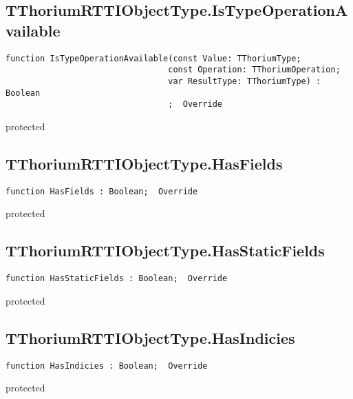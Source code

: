 \subsection{TThoriumRTTIObjectType.IsTypeOperationAvailable}
\label{thoriumcore:thorium:tthoriumrttiobjecttype:istypeoperationavailable}
\begin{FPCList}
\Synopsis
\Declaration 

\begin{verbatim}
function IsTypeOperationAvailable(const Value: TThoriumType;
                                 const Operation: TThoriumOperation;
                                 var ResultType: TThoriumType) : Boolean
                                 ;  Override
\end{verbatim}
\Visibility
protected
\Description
\Errors
\end{FPCList}
\subsection{TThoriumRTTIObjectType.HasFields}
\label{thoriumcore:thorium:tthoriumrttiobjecttype:hasfields}
\begin{FPCList}
\Synopsis
\Declaration 

\begin{verbatim}
function HasFields : Boolean;  Override
\end{verbatim}
\Visibility
protected
\Description
\Errors
\end{FPCList}
\subsection{TThoriumRTTIObjectType.HasStaticFields}
\label{thoriumcore:thorium:tthoriumrttiobjecttype:hasstaticfields}
\begin{FPCList}
\Synopsis
\Declaration 

\begin{verbatim}
function HasStaticFields : Boolean;  Override
\end{verbatim}
\Visibility
protected
\Description
\Errors
\end{FPCList}
\subsection{TThoriumRTTIObjectType.HasIndicies}
\label{thoriumcore:thorium:tthoriumrttiobjecttype:hasindicies}
\begin{FPCList}
\Synopsis
\Declaration 

\begin{verbatim}
function HasIndicies : Boolean;  Override
\end{verbatim}
\Visibility
protected
\Description
\Errors
\end{FPCList}
